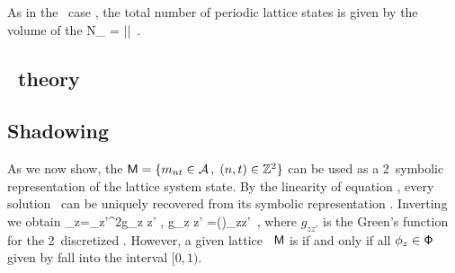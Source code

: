 As in the \templatt\ case , the total number of periodic
lattice states is given by the volume of the {\fundPip}
\beq
N_\cl{} = |\Det\jMorb|
\,.

\subsection{\Po\ theory}
\label{s:catLattPoThe}



\subsection{Shadowing}
\label{s:catLattShadow}



As we now show, the
{\brick}
\(
\mathsf{M}= \{{m_{nt}} \in \mathcal{A} \,,\; (n,t)\in \mathbb{Z}^2 \}
\)
can be used as a 2\dmn\ symbolic representation of the lattice system
state.
By the linearity of equation , every solution \Xx\
can be uniquely recovered from its symbolic representation \Mm. Inverting
\refeq{2dCoupledCats} we obtain
\beq
  \ssp_{z}=\sum_{z'\in\integers^2}g_{z z'} , \qquad  g_{z z' }
       =\left(\frac{1}{-\Box +2(s -2)}\right)_{zz'}
       \,,
where  $g_{z z'}$
is the  Green's
function for the 2\dmn\ discretized \sPe.
However, a given lattice \brick\ $\mathsf{M}$ %
is \emph{{\admissible}} if and only if all  $\phi_{z}\in \mathsf{\Phi}$ given by
\refeq{GreenFuncCoupled} fall into the interval $[0,1)$.

